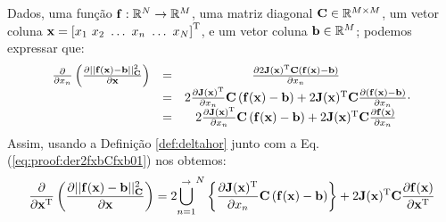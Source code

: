 \begin{myproofT}\label{proof:theo:der2fxbCfxb0}
Dados,
uma função $\VECTOR{f}:\mathbb{R}^{N} \rightarrow \mathbb{R}^{M}$, 
uma matriz diagonal $\MATRIX{C}\in \mathbb{R}^{M\times M}$, 
um vetor coluna $\VECTOR{x}=\left[x_{1}~ x_{2}~ \hdots~ x_{n}~ \hdots~ x_{N}\right]^{\transpose}$, e
um vetor coluna $\VECTOR{b}\in \mathbb{R}^{M}$;
podemos expressar que:
\begin{equation}\label{eq:proof:der2fxbCfxb01}
\begin{matrix}
\frac{\partial }{\partial x_{n}}\left( \frac{\partial ||\VECTOR{f}(\VECTOR{x})-\VECTOR{b}||_{\MATRIX{C}}^2}{\partial \VECTOR{x}} \right) & = &
\frac{\partial 2 \MATRIX{J}(\VECTOR{x})^{\transpose} \MATRIX{C} \left( \VECTOR{f}(\VECTOR{x})-\VECTOR{b}\right)}{\partial x_{n}} \\
~ & = & 2 \frac{\partial \MATRIX{J}(\VECTOR{x})^{\transpose} }{\partial x_{n}} \MATRIX{C} \left( \VECTOR{f}(\VECTOR{x})-\VECTOR{b}\right)+
2  \MATRIX{J}(\VECTOR{x})^{\transpose}  \MATRIX{C} \frac{\partial \left( \VECTOR{f}(\VECTOR{x})-\VECTOR{b}\right) }{\partial x_{n}}\\
~ & = & 2 \frac{\partial \MATRIX{J}(\VECTOR{x})^{\transpose} }{\partial x_{n}} \MATRIX{C} \left( \VECTOR{f}(\VECTOR{x})-\VECTOR{b}\right)+
2  \MATRIX{J}(\VECTOR{x})^{\transpose}  \MATRIX{C} \frac{\partial \VECTOR{f}(\VECTOR{x}) }{\partial x_{n}}\\
\end{matrix}.
\end{equation}
Assim, usando a Definição \ref{def:deltahor} junto com a Eq. (\ref{eq:proof:der2fxbCfxb01})
nos obtemos:
\begin{equation}\label{eq:proof:der2fxbCfxb02}
\frac{\partial }{\partial \VECTOR{x}^{\transpose}}\left( \frac{\partial ||\VECTOR{f}(\VECTOR{x})-\VECTOR{b}||_{\MATRIX{C}}^2}{\partial \VECTOR{x}} \right) =
2 {\bigcup\limits_{n=1}^{ \rightarrow }}^{N}\left\{ \frac{\partial \MATRIX{J}(\VECTOR{x})^{\transpose} }{\partial x_{n}} \MATRIX{C} \left( \VECTOR{f}(\VECTOR{x})-\VECTOR{b}\right) \right\} +
2  \MATRIX{J}(\VECTOR{x})^{\transpose}  \MATRIX{C} \frac{\partial \VECTOR{f}(\VECTOR{x}) }{\partial \VECTOR{x}^{\transpose}}
\end{equation}
\end{myproofT}


